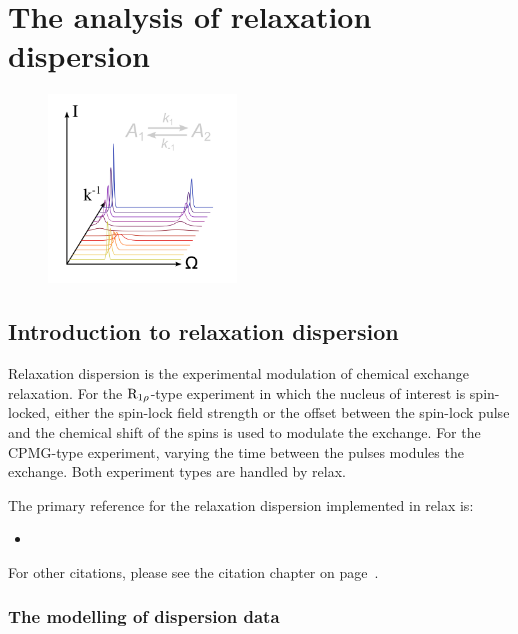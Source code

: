 
\chapter[Relaxation dispersion]{The analysis of relaxation dispersion} \label{ch: relax-disp}

\begin{figure}[h]
  \includegraphics[width=5cm, bb=0 0 1701 1701]{graphics/analyses/relax_disp_600x600}
\end{figure}



\section{Introduction to relaxation dispersion}

Relaxation dispersion is the experimental modulation of chemical exchange relaxation.
For the $\mathrm{R}_{1\rho}$-type experiment in which the nucleus of interest is spin-locked, either the spin-lock field strength or the offset between the spin-lock pulse and the chemical shift of the spins is used to modulate the exchange.
For the CPMG-type experiment, varying the time between the pulses modules the exchange.
Both experiment types are handled by relax.

The primary reference for the relaxation dispersion implemented in relax is:
\begin{itemize}
  \item {}
\end{itemize}

For other citations, please see the citation chapter on page~\pageref{ch: citations}.



\subsection{The modelling of dispersion data}

